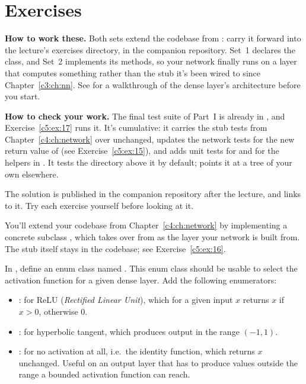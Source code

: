 
\section{Exercises}
\label{c5:sec:exercises}\label{c5:app:b}

\begin{aside}
\textbf{How to work these.} Both sets extend the  codebase from
: carry it forward into the lecture's exercises directory,
 in the companion repository. Set~1 declares the
 class, and Set~2 implements its methods, so your network finally runs on a layer that
computes something rather than the stub it's been wired to since Chapter~\ref{c3:ch:nn}. See
 for a walkthrough of the dense layer's architecture before you start.

\textbf{How to check your work.} The final test suite of Part~I is already in
, and Exercise~\ref{c5:ex:17} runs it. It's cumulative:
it carries the stub tests from Chapter~\ref{c4:ch:network} over unchanged, updates the network
tests for the new return value of  (see Exercise~\ref{c5:ex:15}), and adds unit tests
for  and for the helpers in . It tests the directory above it by
default;  points it at a tree of your own elsewhere.

The solution is published in the companion repository after the lecture, and
 links to it. Try each exercise yourself before looking at it.
\end{aside}

\label{c5:set:1}
You'll extend your  codebase from Chapter~\ref{c4:ch:network} by implementing a concrete
subclass , which takes over from  as the layer your network
is built from. The stub itself stays in the codebase; see Exercise~\ref{c5:ex:16}.

\label{c5:ex:1}
In , define an enum class named . This enum class should be usable
to select the activation function for a given dense layer. Add the following enumerators:
\begin{itemize}
  \item {}: for ReLU (\emph{Rectified Linear Unit}), which for a given input $x$ returns
    $x$ if $x > 0$, otherwise 0.
  \item {}: for hyperbolic tangent, which produces output in the range $(-1, 1)$.
  \item {}: for no activation at all, i.e.\ the identity function, which returns $x$
    unchanged. Useful on an output layer that has to produce values outside the range a bounded
    activation function can reach.
\end{itemize}

